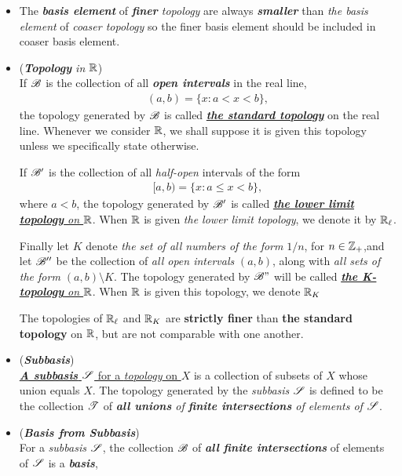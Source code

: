 \documentclass[11pt]{article}
\begin{document}
\begin{itemize}
\item \begin{remark}
The \emph{\textbf{basis element}} of \emph{\textbf{finer} topology} are always \emph{\textbf{smaller}} than \emph{the basis element} of \emph{coaser topology} so the finer basis element should be included in coaser basis element.
\end{remark}

\item \begin{example} (\emph{\textbf{Topology} in ${\mathbb R}$})\\
If ${\mathscr B}$ is the collection of all \emph{\textbf{open intervals}} in the real line,
\begin{align*}
(a,b) = \{x: a < x < b\},
\end{align*}
the topology generated by ${\mathscr B}$ is called \underline{\emph{\textbf{the standard topology}}} on the real line. Whenever we consider ${\mathbb R}$, we shall suppose it is given this topology unless we specifically state otherwise.

If ${\mathscr B}'$ is the collection of all \emph{half-open} intervals of the form
\begin{align*}
[a,b) = \{x: a \le  x < b\},
\end{align*} where $a < b$, the topology generated by ${\mathscr B}'$ is called \underline{\emph{\textbf{the lower limit topology} on ${\mathbb R}$}}. When ${\mathbb R}$ is given \emph{the lower limit topology}, we denote it by ${\mathbb R}_{\ell}$.

Finally let $K$ denote \emph{the set of all numbers of the form} $1/n$, for $n \in {\mathbb Z}_{+}$,and let ${\mathscr B}''$ be the collection of \emph{all open intervals} $(a,b)$, along with \emph{all sets of the form $(a,b) \setminus K$}. The topology generated by ${\mathscr B}"$ will be called \underline{\emph{\textbf{the K-topology} on ${\mathbb R}$}}. When ${\mathbb R}$ is given this topology, we denote ${\mathbb R}_{K}$

\begin{lemma}
The topologies of ${\mathbb R}_{\ell}$ and ${\mathbb R}_{K}$ are \textbf{strictly finer} than \textbf{the standard topology} on ${\mathbb R}$, but are not comparable with one another.
\end{lemma}
\end{example}

\item \begin{definition}(\emph{\textbf{Subbasis}})\\
\underline{\emph{\textbf{A subbasis}} ${\mathscr S}$ for a \emph{topology} on $X$} is a collection of subsets of $X$ whose union equals $X$. The topology generated by the \emph{subbasis} ${\mathscr S}$ is defined to be the  collection ${\mathscr T}$ of \emph{\textbf{all unions} of \textbf{finite intersections} of elements of ${\mathscr S}$}.
\end{definition}

\item \begin{remark}(\textbf{\emph{Basis from Subbasis}})\\
For a \emph{subbasis} ${\mathscr S}$, the collection ${\mathscr B}$ of \emph{\textbf{all finite intersections}} of elements of ${\mathscr S}$ is a \emph{\textbf{basis}},
\end{remark}
\end{itemize}
\end{document}
